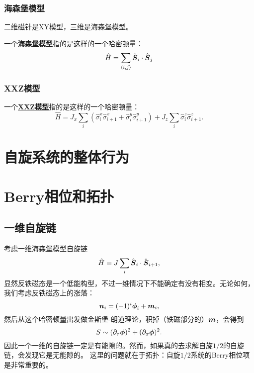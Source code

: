\documentclass[hyperref, UTF8, a4paper]{ctexart}
\newcommand*{\pair}[1]{\langle #1 \rangle}
\newcommand*{\concept}[1]{\underline{\textbf{#1}}}
\begin{document}
\subsubsection{海森堡模型}

二维磁针是XY模型，三维是海森堡模型。

一个\concept{海森堡模型}指的是这样的一个哈密顿量：
\begin{equation}
    \hat{H} = \sum_{\pair{i, j}} \hat{\vb*{S}}_i \cdot \hat{\vb*{S}}_j
\end{equation}

\subsubsection{XXZ模型}

一个\concept{XXZ模型}指的是这样的一个哈密顿量：
\begin{equation}
    \hat{H} = J_x \sum_i (\hat{\sigma}_{i}^x \hat{\sigma}_{i+1}^x + \hat{\sigma}_{i}^y \hat{\sigma}_{i+1}^y) + J_z \sum_{i} \hat{\sigma}_i^z \hat{\sigma}_{i+1}^z.
\end{equation}

\section{自旋系统的整体行为}

\section{Berry相位和拓扑}

\subsection{一维自旋链}

考虑一维海森堡模型自旋链
\begin{equation}
    \hat{H} = J \sum_i \hat{\vb*{S}}_{i} \cdot \hat{\vb*{S}}_{i+1},
\end{equation}
显然反铁磁态是一个低能构型，不过一维情况下不能确定有没有相变。无论如何，我们考虑反铁磁态上的涨落：
\begin{equation}
    \vb*{n}_i = (-1)^i \vb*{\phi}_i + \vb*{m}_i,
\end{equation}
然后从这个哈密顿量出发做金斯堡-朗道理论，积掉（铁磁部分的）$\vb*{m}$，会得到
\[
    S \sim (\partial_\tau \vb*{\phi})^2 + (\partial_x \vb*{\phi})^2.
\]
因此一个一维的自旋链一定是有能隙的。然而，如果真的去求解自旋$1/2$的自旋链，会发现它是无能隙的。
这里的问题就在于拓扑：自旋$1/2$系统的Berry相位项是非常重要的。
\end{document}
